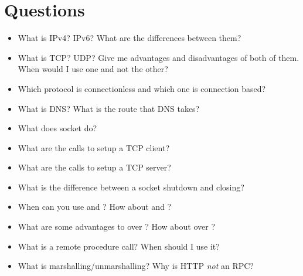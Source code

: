 \section{Questions}

\begin{itemize}
\tightlist
\item
  What is IPv4? IPv6? What are the differences between them?
\item
  What is TCP? UDP? Give me advantages and disadvantages of both of them.
  When would I use one and not the other?
\item
  Which protocol is connectionless and which one is connection based?
\item
  What is DNS? What is the route that DNS takes?
\item
  What does socket do?
\item
  What are the calls to setup a TCP client?
\item
  What are the calls to setup a TCP server?
\item
  What is the difference between a socket shutdown and closing?
\item
  When can you use  and ? How about  and ?
\item
  What are some advantages to  over ? How about  over ?
\item
  What is a remote procedure call? When should I use it?
\item
  What is marshalling/unmarshalling? Why is HTTP \emph{not} an RPC?
\end{itemize}



